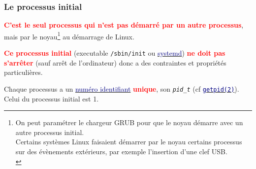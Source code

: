 \documentclass[lualatex,11pt,a4paper,svgnames,french]{beamer}
\newcommand{\clbrougras}[1]{{\textcolor{Red}{\textbf{#1}}}}
\begin{document}
\begin{frame}\frametitle{Le processus initial}
  \clbrougras{C'est le seul processus qui n'est pas démarré par un
    autre processus}, mais par le noyau\footnote{On peut paramétrer le
  chargeur GRUB pour que le noyau démarre avec un autre processus
  initial.\\ Certains systèmes Linux faisaient démarrer par le noyau
  certains processus sur des évènements extérieurs, par exemple
  l'insertion d'une clef USB.\\} au démarrage de Linux.

  \bigskip
  
  \clbrougras{Ce processus initial} (executable \texttt{/sbin/init} ou
  \href{https://fr.wikipedia.org/wiki/Systemd}{\textcolor{Navy}{systemd}})
  \clbrougras{ne doit pas s'arrêter} (sauf arrêt de l'ordinateur) donc
  a des contraintes et propriétés particulières.

  \bigskip

  Chaque processus a un
  \href{https://fr.wikipedia.org/wiki/Identifiant_de_processus}{\textcolor{Navy}{numéro
      identifiant}} \clbrougras{unique}, son \texttt{\textit{pid\_t}} (cf
  \href{https://man7.org/linux/man-pages/man2/getpid.2.html}{\textcolor{Navy}{\texttt{getpid(2)}}}). Celui
  du processus initial est 1.
\end{frame}
\end{document}
